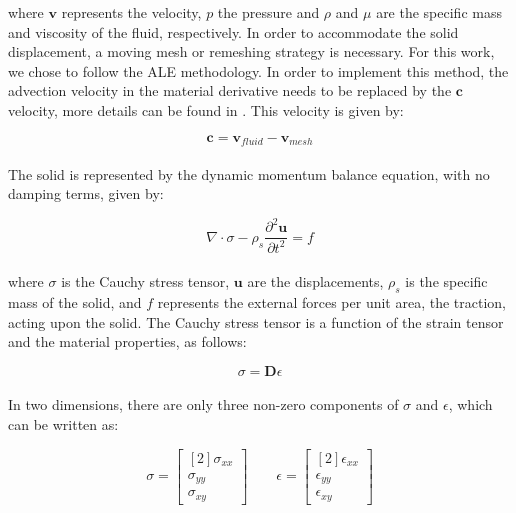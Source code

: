 \documentclass{article}
\begin{document}
\noindent where $\mathbf{v}$ represents the velocity, $p$ the pressure and $\rho$ and $\mu$ are the specific mass and viscosity of the fluid, respectively. In order to accommodate the solid displacement, a moving mesh or remeshing strategy is necessary. For this work, we chose to follow the ALE methodology. In order to implement this method, the advection velocity in the material derivative needs to be replaced by the $\mathbf{c}$ velocity, more details can be found in \cite{anjos_moving_2021}. This velocity is given by:

\begin{equation}
	\mathbf{c} = \mathbf{v}_{fluid} - \mathbf{v}_{mesh}
\end{equation} \\

The solid is represented by the dynamic momentum balance equation, with no damping terms, given by:

\begin{equation}
	\nabla \cdot \sigma
	- \rho_s \frac{\partial ^2 \mathbf{u} }{\partial t ^2 } = f
	\label{eq:Solid Momentum}
\end{equation} \\

\noindent where $\sigma$ is the Cauchy stress tensor, $\mathbf{u}$ are the displacements, $\rho_s$ is the specific mass of the solid, and $f$ represents the external forces per unit area, the traction, acting upon the solid. The Cauchy stress tensor is a function of the strain tensor and the material properties, as follows: 

\begin{equation}
	\sigma = \mathbf{D} \epsilon
\end{equation} \\

In two dimensions, there are only three non-zero components of $\sigma$ and $\epsilon$, which can be written as:

\begin{equation}
	\sigma
	=
	\begin{bmatrix}[2]
		\sigma_{xx} \\
		\sigma_{yy} \\
		\sigma_{xy}
	\end{bmatrix}
	\qquad
	\epsilon
	=
	\begin{bmatrix}[2]
		\epsilon_{xx} \\
		\epsilon_{yy} \\
		\epsilon_{xy}
	\end{bmatrix}
\end{equation} \\
\end{document}
